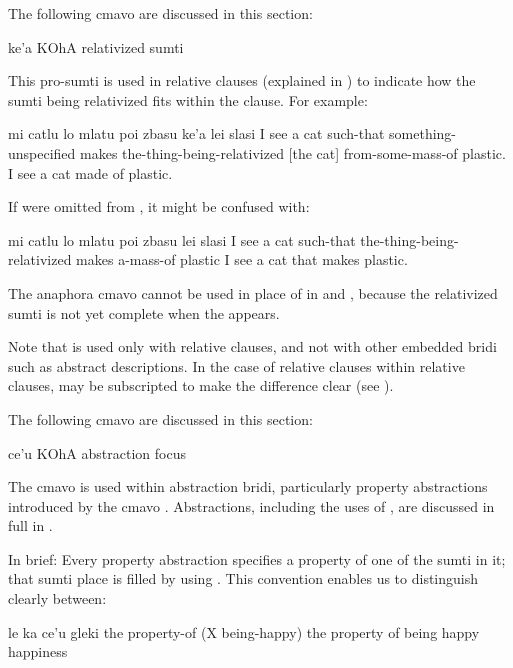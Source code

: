 
The following cmavo are discussed in this section:

   ke'a    KOhA            relativized sumti

This pro-sumti is used in relative clauses (explained in ) to indicate how the sumti
    being relativized fits within the clause. For example:
\begin{example}
mi catlu lo mlatu\n
\T	poi  zbasu\n
\T	ke'a\n
\T	lei slasi\n
I see a cat such-that\n
\T	something-unspecified makes\n
\T	the-thing-being-relativized [the cat]\n
\T	from-some-mass-of plastic.\n
I see a cat made of plastic.
\end{example}

If  were omitted from , it might be confused with:
\begin{example}
mi catlu lo mlatu poi \n
\T	zbasu lei slasi\n
I see a cat such-that the-thing-being-relativized\n
{} makes a-mass-of plastic\n
I see a cat that makes plastic.
\end{example}

The anaphora cmavo  cannot be used in place of 
    in  and , because the relativized sumti
    is not yet complete when the  appears. 

Note that  is used only with relative clauses, and
    not with other embedded bridi such as abstract descriptions. In
    the case of relative clauses within relative clauses, 
    may be subscripted to make the difference clear (see ).




The following cmavo are discussed in this section:

   ce'u    KOhA            abstraction focus

The cmavo  is used within abstraction bridi,
    particularly property abstractions introduced by the cmavo
    . Abstractions, including the uses of , are
    discussed in full in . 

In brief: Every property abstraction specifies a property of
    one of the sumti in it; that sumti place is filled by using
    . This convention enables us to distinguish clearly
    between:
\begin{example}
le ka ce'u gleki\n
the property-of (X being-happy)\n
the property of being happy\n
happiness
\end{example}

